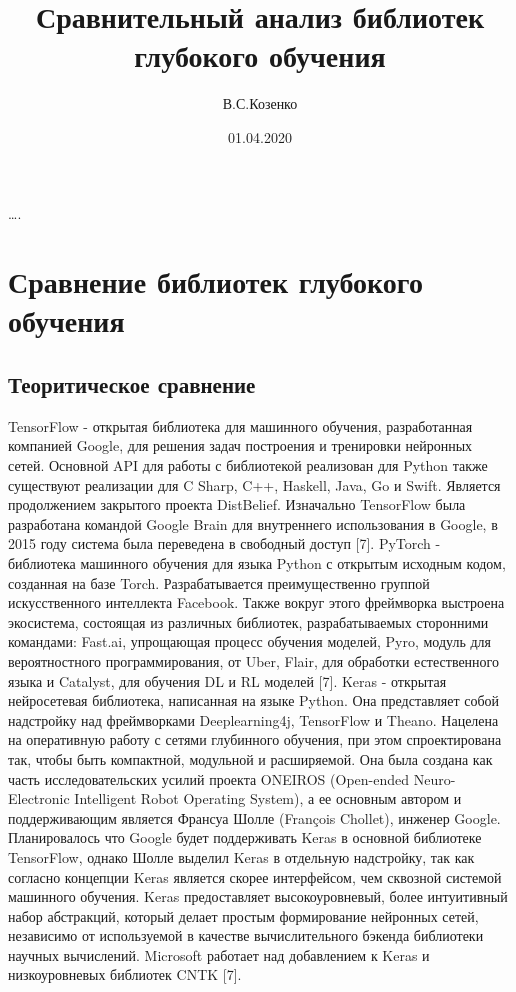 \documentclass{micmo}
\title{Сравнительный анализ библиотек глубокого обучения} %
\author{В.\;С.\;Козенко}%
{Крымский федеральный университет им.\;В.\;И.\;Вернадского, \textit{e-mail: mail@.ru}} %
\date{01.04.2020} %
\begin{document}
\begin{article}

{\ldots.} %




\section{Сравнение библиотек глубокого обучения}
\subsection{Теоритическое сравнение}

TensorFlow - открытая библиотека для машинного обучения, разработанная компанией Google, для решения задач построения и тренировки нейронных сетей. Основной API для работы с библиотекой реализован для Python также существуют реализации для C Sharp, C++, Haskell, Java, Go и Swift. Является продолжением закрытого проекта DistBelief. Изначально TensorFlow была разработана командой Google Brain для внутреннего использования в Google, в 2015 году система была переведена в свободный доступ [7].
PyTorch - библиотека машинного обучения для языка Python с открытым исходным кодом, созданная на базе Torch. Разрабатывается преимущественно группой искусственного интеллекта Facebook. Также вокруг этого фреймворка выстроена экосистема, состоящая из различных библиотек, разрабатываемых сторонними командами: Fast.ai, упрощающая процесс обучения моделей, Pyro, модуль для вероятностного программирования, от Uber, Flair, для обработки естественного языка и Catalyst, для обучения DL и RL моделей [7].
Keras - открытая нейросетевая библиотека, написанная на языке Python. Она представляет собой надстройку над фреймворками Deeplearning4j, TensorFlow и Theano. Нацелена на оперативную работу с сетями глубинного обучения, при этом спроектирована так, чтобы быть компактной, модульной и расширяемой. Она была создана как часть исследовательских усилий проекта ONEIROS (Open-ended Neuro-Electronic Intelligent Robot Operating System), а ее основным автором и поддерживающим является Франсуа Шолле (François Chollet), инженер Google. Планировалось что Google будет поддерживать Keras в основной библиотеке TensorFlow, однако Шолле выделил Keras в отдельную надстройку, так как согласно концепции Keras является скорее интерфейсом, чем сквозной системой машинного обучения. Keras предоставляет высокоуровневый, более интуитивный набор абстракций, который делает простым формирование нейронных сетей, независимо от используемой в качестве вычислительного бэкенда библиотеки научных вычислений. Microsoft работает над добавлением к Keras и низкоуровневых библиотек CNTK [7].




\end{article}
\end{document}
